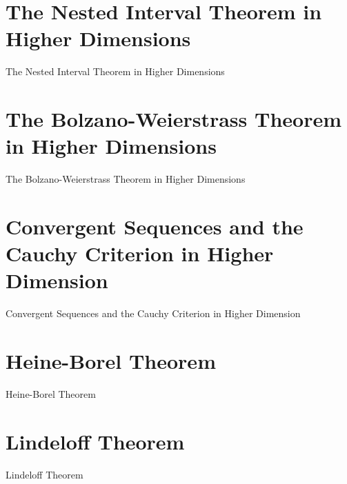 \section{The Nested Interval Theorem in Higher Dimensions}
\label{sec:the-nested-interval-theorem-in-higher-dimensions}

The Nested Interval Theorem in Higher Dimensions

\section{The Bolzano-Weierstrass Theorem in Higher Dimensions}
\label{sec:the-bolzano-weierstrass-theorem-in-higher-dimensions}

The Bolzano-Weierstrass Theorem in Higher Dimensions

\section{Convergent Sequences and the Cauchy Criterion in Higher Dimension}
\label{sec:convergent-sequences-and-the-cauchy-criterion-in-higher-dimension}

Convergent Sequences and the Cauchy Criterion in Higher Dimension

\section{Heine-Borel Theorem}
\label{sec:heine-borel-theorem}

Heine-Borel Theorem

\section{Lindeloff Theorem}
\label{sec:lindeloff-theorem}

Lindeloff Theorem

